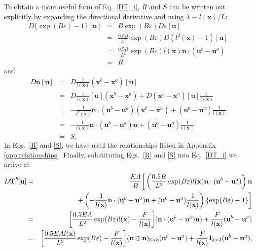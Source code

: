 To obtain a more useful form of Eq.\ \eqref{DT_i}, $R$ and $S$ can be written out explicitly by expanding the directional derivative and using $\lambda \equiv l(\textbf{x})/L$:
%
\begin{eqnarray}
D \{ \exp(B \varepsilon) - 1\} [\textbf{u}] &=& B \exp(B \varepsilon) D \varepsilon [\textbf{u}] \nonumber\\
&=& \frac{0.5B}{L^2} \exp(B \varepsilon)  D( l^2(\textbf{x}) - 1) [\textbf{u}] \nonumber\\
&=&  \frac{0.5B}{L^2}\exp(B \varepsilon)   l(\textbf{x})\textbf{n} \cdot (\textbf{u}^b - \textbf{u}^a) \nonumber\\
&=& R
\label{R}
\end{eqnarray}
%
and
%
\begin{eqnarray}
D \textbf{n} [\textbf{u}]  &=& D \frac{1}{l(\textbf{x})}(\textbf{x}^b - \textbf{x}^a) [\textbf{u}] \nonumber\\
&=& D \frac{1}{l(\textbf{x})} [\textbf{u}](\textbf{x}^b - \textbf{x}^a) + D (\textbf{x}^b - \textbf{x}^a) [\textbf{u}] \frac{1}{l(\textbf{x})} \nonumber\\
&=& -\frac{1}{l^{2}(\textbf{x})}\textbf{n} \cdot (\textbf{u}^b - \textbf{u}^a)(\textbf{x}^b - \textbf{x}^a) + (\textbf{u}^b - \textbf{u}^a)  \frac{1}{l(\textbf{x})} \nonumber\\
&=& -\frac{1}{l(\textbf{x})}\textbf{n} \cdot (\textbf{u}^b - \textbf{u}^a)\textbf{n} + (\textbf{u}^b - \textbf{u}^a)  \frac{1}{l(\textbf{x})} \nonumber\\
&=& S.
\label{S}
\end{eqnarray}
%
In Eqs.\ \eqref{R} and \eqref{S}, we have used the relationships listed in Appendix \ref{app:relationships}. Finally, substituting Eqs.\ \eqref{R} and \eqref{S} into Eq.\ \eqref{DT_i} we arrive at
%
\begin{eqnarray}
D\textbf{T}^b [\textbf{u}] &=& \frac{E A}{B} \bigg[ \left(\frac{0.5B }{L^2} \exp(B \varepsilon) l(\textbf{x})\textbf{n} \cdot (\textbf{u}^b - \textbf{u}^a) \right)\textbf{n} \nonumber\\
&& + \left( -\frac{1}{l(\textbf{x})}\textbf{n} \cdot (\textbf{u}^b - \textbf{u}^a)\textbf{n} + (\textbf{u}^b - \textbf{u}^a)  \frac{1}{l(\textbf{x})} \right) \{ \exp(B \varepsilon) - 1 \} \bigg] \nonumber\\
&=& \bigg[ \frac{0.5E A }{L^2} \exp(B \varepsilon)  l(\textbf{x})-\frac{F}{l(\textbf{x})} \bigg] (\textbf{n} \cdot (\textbf{u}^b - \textbf{u}^a)\textbf{n}) + \frac{F}{l(\textbf{x})} (\textbf{u}^b - \textbf{u}^a) \nonumber\\
&=& \bigg[ \frac{0.5E A  l(\textbf{x})}{L^2} \exp(B \varepsilon) -\frac{F}{l(\textbf{x})} \bigg] (\textbf{n} \otimes \textbf{n})_{3\times3}(\textbf{u}^b - \textbf{u}^a) + \frac{F}{l(\textbf{x})} \text{\textbf{I}}_{3\times3} (\textbf{u}^b - \textbf{u}^a) , \nonumber\\
\label{DTi_final}
\end{eqnarray}
